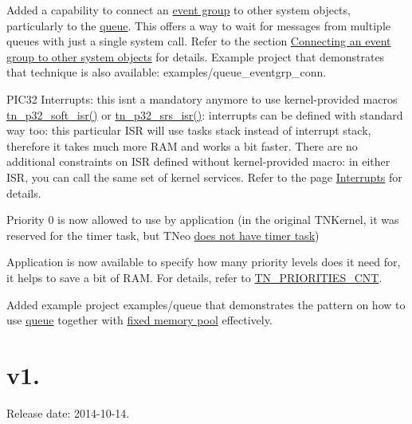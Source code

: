 \begin{DoxyItemize}
\item Added a capability to connect an \hyperlink{tn__eventgrp_8h}{event group} to other system objects, particularly to the \hyperlink{tn__dqueue_8h}{queue}. This offers a way to wait for messages from multiple queues with just a single system call. Refer to the section \hyperlink{tn__eventgrp_8h_eventgrp_connect}{Connecting an event group to other system objects} for details. Example project that demonstrates that technique is also available\+: {\ttfamily examples/queue\+\_\+eventgrp\+\_\+conn}.
\item P\+I\+C32 Interrupts\+: this isn\textquotesingle{}t a mandatory anymore to use kernel-\/provided macros {\ttfamily \hyperlink{tn__arch__pic32_8h_a02d853d8d573f928fb8da65ef0c2bc8e}{tn\+\_\+p32\+\_\+soft\+\_\+isr()}} or {\ttfamily \hyperlink{tn__arch__pic32_8h_a523bb667617e6bb6f68a8f85855030a5}{tn\+\_\+p32\+\_\+srs\+\_\+isr()}}\+: interrupts can be defined with standard way too\+: this particular I\+SR will use task\textquotesingle{}s stack instead of interrupt stack, therefore it takes much more R\+AM and works a bit faster. There are no additional constraints on I\+SR defined without kernel-\/provided macro\+: in either I\+SR, you can call the same set of kernel services. Refer to the page \hyperlink{interrupts}{Interrupts} for details.
\item Priority 0 is now allowed to use by application (in the original T\+N\+Kernel, it was reserved for the timer task, but T\+Neo \hyperlink{tnkernel_diff_tnkernel_diff_timer_task}{does not have timer task})
\item Application is now available to specify how many priority levels does it need for, it helps to save a bit of R\+AM. For details, refer to {\ttfamily \hyperlink{tn__cfg__default_8h_aad74a059c61567c68a1e9067ab47a256}{T\+N\+\_\+\+P\+R\+I\+O\+R\+I\+T\+I\+E\+S\+\_\+\+C\+NT}}.
\item Added example project {\ttfamily examples/queue} that demonstrates the pattern on how to use \hyperlink{tn__dqueue_8h}{queue} together with \hyperlink{tn__fmem_8h}{fixed memory pool} effectively.
\end{DoxyItemize}\hypertarget{changelog_changelog_v1_02}{}\section{v1.}\label{changelog_changelog_v1_02}
Release date\+: 2014-\/10-\/14.


